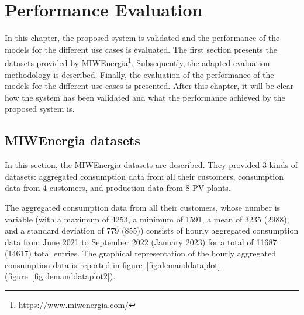 \chapter{Performance Evaluation}
\label{cha:evaluation}
\vspace{0.4 cm}

In this chapter, the proposed system is validated and the performance of the models for the different use cases is evaluated.
The first section presents the datasets provided by MIWEnergia\footnote{ \url{https://www.miwenergia.com/} }.
Subsequently, the adapted evaluation methodology is described.
Finally, the evaluation of the performance of the models for the different use cases is presented.
After this chapter, it will be clear how the system has been validated and what the performance achieved by the proposed system is.


\section{MIWEnergia datasets}
\label{sec:datasets}
\vspace{0.2 cm}

In this section, the MIWEnergia datasets are described.
They provided 3 kinds of datasets: aggregated consumption data from all their customers, consumption data from 4 customers, and production data from 8 PV plants.

The aggregated consumption data from all their customers, whose number is variable (with a maximum of 4253, a minimum of 1591, a mean of 3235 (2988), and a standard deviation of 779 (855)) consists of hourly aggregated consumption data from June 2021 to September 2022 (January 2023) for a total of 11687 (14617) total entries.
The graphical representation of the hourly aggregated consumption data is reported in figure~\ref{fig:demanddataplot} (figure~\ref{fig:demanddataplot2}).

